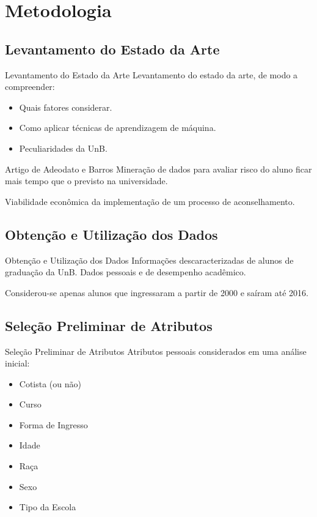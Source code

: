 \section{Metodologia} 
\subsection{Levantamento do Estado da Arte}
\begin{frame}{Levantamento do Estado da Arte}
    Levantamento do estado da arte, de modo a compreender: 
    \begin{itemize}
        \item Quais fatores considerar.
        \item Como aplicar técnicas de aprendizagem de máquina.
        \item Peculiaridades da UnB.
    \end{itemize}
\end{frame}

\begin{frame}{Artigo de Adeodato e Barros \cite{adeodato}}
    Mineração de dados para avaliar risco do aluno ficar mais tempo que o previsto na
    universidade.

    \vspace{0.5cm}

    Viabilidade econômica da implementação de um processo de aconselhamento. 
\end{frame}

\subsection{Obtenção e Utilização dos Dados}
\begin{frame}{Obtenção e Utilização dos Dados}
    Informações descaracterizadas de alunos de graduação da UnB. Dados pessoais e de
    desempenho acadêmico. 

    \vspace{0.5cm}

    Considerou-se apenas alunos que ingressaram a partir de 2000 e saíram até 2016.
\end{frame}

\subsection{Seleção Preliminar de Atributos}
\begin{frame}{Seleção Preliminar de Atributos}
    Atributos pessoais considerados em uma análise inicial: 
    \begin{itemize}
        \item Cotista (ou não)
        \item Curso 
        \item Forma de Ingresso
        \item Idade
        \item Raça 
        \item Sexo 
        \item Tipo da Escola
    \end{itemize}
\end{frame}

